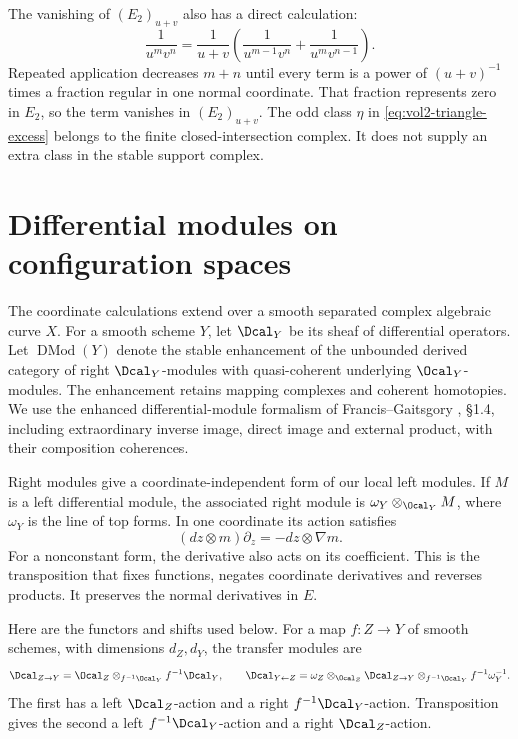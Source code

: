 The vanishing of $(E_2)_{u+v}$ also has a direct calculation:
\[
 \frac1{u^mv^n}=
 \frac1{u+v}\left(\frac1{u^{m-1}v^n}
                       +\frac1{u^mv^{n-1}}\right).
\]
Repeated application decreases $m+n$ until every term is a power
of $(u+v)^{-1}$ times a fraction regular in one normal coordinate.
That fraction represents zero in $E_2$, so the term vanishes in
$(E_2)_{u+v}$.
The odd class $\eta$ in \eqref{eq:vol2-triangle-excess} belongs
to the finite closed-intersection complex. It does not supply an
extra class in the stable support complex.

\section{Differential modules on configuration spaces}
\label{sec:vol2-geometric-coefficients}

The coordinate calculations extend over a smooth separated complex
algebraic curve $X$. For a smooth scheme $Y$, let $\Dcal_Y$ be its
sheaf of differential operators. Let $\operatorname{DMod}(Y)$
denote the stable enhancement of the unbounded derived category
of right $\Dcal_Y$-modules with quasi-coherent underlying
$\Ocal_Y$-modules. The enhancement retains mapping complexes
and coherent homotopies. We use the enhanced differential-module
formalism of Francis--Gaitsgory \cite{FG12}, \S1.4, including
extraordinary inverse image, direct image and external product,
with their composition coherences.

Right modules give a coordinate-independent form of our local
left modules. If $M$ is a left differential module, the associated
right module is $\omega_Y\otimes_{\Ocal_Y}M$, where $\omega_Y$
is the line of top forms. In one coordinate its action satisfies
\[
 (dz\otimes m)\partial_z=-dz\otimes\nabla m.
\]
For a nonconstant form, the derivative also acts on its coefficient.
This is the transposition that fixes functions, negates coordinate
derivatives and reverses products. It preserves the normal derivatives
in $E$.

Here are the functors and shifts used below. For a map $f:Z\to Y$
of smooth schemes, with dimensions $d_Z,d_Y$, the transfer modules are
\[
 \Dcal_{Z\to Y}
 =\Ocal_Z\otimes_{f^{-1}\Ocal_Y}f^{-1}\Dcal_Y,
 \qquad
 \Dcal_{Y\leftarrow Z}
 =\omega_Z\otimes_{\Ocal_Z}\Dcal_{Z\to Y}
       \otimes_{f^{-1}\Ocal_Y}f^{-1}\omega_Y^{-1}.
\]
The first has a left $\Dcal_Z$-action and a right
$f^{-1}\Dcal_Y$-action. Transposition gives the second a left
$f^{-1}\Dcal_Y$-action and a right $\Dcal_Z$-action.

